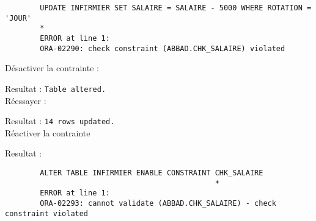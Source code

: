\documentclass[12pt,a4paper]{article}
\begin{document}
\begin{enumerate}
\begin{verbatim}
		UPDATE INFIRMIER SET SALAIRE = SALAIRE - 5000 WHERE ROTATION = 'JOUR'
		*
		ERROR at line 1:
		ORA-02290: check constraint (ABBAD.CHK_SALAIRE) violated
		\end{verbatim}
		Désactiver la contrainte :
		
		Resultat : \texttt{Table altered.}\\
		Réessayer :
		
		Resultat : \texttt{14 rows updated.}\\
		Réactiver la contrainte
		
		Resultat :
		\begin{verbatim}
		ALTER TABLE INFIRMIER ENABLE CONSTRAINT CHK_SALAIRE
		                                        *
		ERROR at line 1:
		ORA-02293: cannot validate (ABBAD.CHK_SALAIRE) - check constraint violated
		\end{verbatim}
	\end{enumerate}
\end{document}
